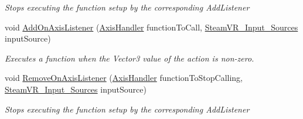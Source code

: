 \begin{DoxyCompactItemize}
\begin{DoxyCompactList}\small\item\em Stops executing the function setup by the corresponding Add\+Listener \end{DoxyCompactList}\item 
void \mbox{\hyperlink{class_valve_1_1_v_r_1_1_steam_v_r___action___vector3_a29dcca796420e96a856cff97a7b20924}{Add\+On\+Axis\+Listener}} (\mbox{\hyperlink{class_valve_1_1_v_r_1_1_steam_v_r___action___vector3_a9b135b663b22c421dc36dbc48d2d35b6}{Axis\+Handler}} function\+To\+Call, \mbox{\hyperlink{namespace_valve_1_1_v_r_a82e5bf501cc3aa155444ee3f0662853f}{Steam\+V\+R\+\_\+\+Input\+\_\+\+Sources}} input\+Source)
\begin{DoxyCompactList}\small\item\em Executes a function when the Vector3 value of the action is non-\/zero. \end{DoxyCompactList}\item 
void \mbox{\hyperlink{class_valve_1_1_v_r_1_1_steam_v_r___action___vector3_aa83da03bd829262cb3667db3394fdb35}{Remove\+On\+Axis\+Listener}} (\mbox{\hyperlink{class_valve_1_1_v_r_1_1_steam_v_r___action___vector3_a9b135b663b22c421dc36dbc48d2d35b6}{Axis\+Handler}} function\+To\+Stop\+Calling, \mbox{\hyperlink{namespace_valve_1_1_v_r_a82e5bf501cc3aa155444ee3f0662853f}{Steam\+V\+R\+\_\+\+Input\+\_\+\+Sources}} input\+Source)
\begin{DoxyCompactList}\small\item\em Stops executing the function setup by the corresponding Add\+Listener \end{DoxyCompactList}\end{DoxyCompactItemize}

